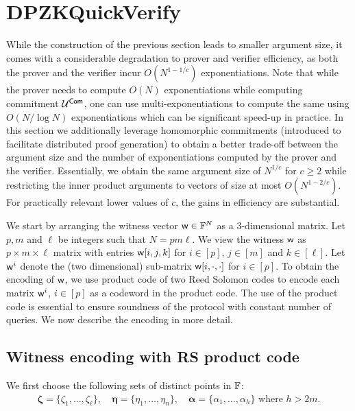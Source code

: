 \newcommand{\fft}{\mathsf{FFT}}
\newcommand{\ifft}{\mathsf{IFFT}}
\newcommand{\open}{\mathsf{Open}}

\section{DPZKQuickVerify} \label{sec:quickverify}
While the construction of the previous section leads to smaller argument size,
it comes with a considerable degradation to prover and verifier efficiency, as
both the prover and the verifier incur $O(N^{1-1/c})$ exponentiations. Note
that while the prover needs to compute $O(N)$ exponentiations while computing
commitment $\mathcal{U}^{\mathsf{Com}}$, one can use multi-exponentiations to compute the same
using $O(N/\log{N})$ exponentiations which can be significant speed-up in
practice. In this section we additionally leverage homomorphic commitments
(introduced to facilitate distributed proof generation) to obtain a better
trade-off between the argument size and the number of exponentiations computed
by the prover and the verifier. Essentially, we obtain the same argument size
of $N^{1/c}$ for $c\geq 2$ while restricting the inner product arguments to
vectors of size at most $O(N^{1-2/c})$. For practically relevant lower values
of $c$, the gains in efficiency are substantial.
   
We start by arranging the witness vector $\mathsf{w}\in \mathbb{F}^N$ as a $3$-dimensional
 matrix. Let $p,m$ and $\ell$ be integers such that $N=pm\ell$. We view the
witness $\mathsf{w}$ 
as $p\times m\times\ell$ matrix with entries $\mathsf{w}[i,j,k]$ for $i\in [p]$,
$j\in [m]$ and $k\in [\ell]$. Let $\mathsf{w}^i$ denote the (two dimensional) sub-matrix
$\mathsf{w}[i,\cdot,\cdot]$ for $i\in [p]$. To obtain the encoding of
$\mathsf{w}$, we use product code of two Reed Solomon codes to encode each matrix
$\mathsf{w}^i$,
$i\in [p]$ as a codeword in the product code. The use of the product code is
essential to ensure soundness of the protocol with constant number of queries.
We now describe the encoding in more detail.

\subsection{Witness encoding with RS product code}
We first choose the following sets of distinct points in $\mathbb{F}$:
\begin{align}\label{eq:points}
\bm{\zeta} =\{\zeta_1,\ldots,\zeta_{\ell}\},\quad 
\bm{\eta}  = \{\eta_1,\ldots,\eta_n \},\quad
\bm{\alpha} = \{\alpha_1,\ldots,\alpha_{h}\} \text{ where } h>2m. 
\end{align}

